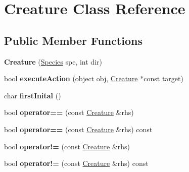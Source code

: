 \hypertarget{class_creature}{\section{Creature Class Reference}
\label{class_creature}
}
\subsection*{Public Member Functions}
\begin{DoxyCompactItemize}
\item 
\hypertarget{class_creature_afe661d9b6eeb76c8e0b7eb8d79b84298}{{\bfseries Creature} (\hyperlink{class_species}{Species} spe, int dir)}\label{class_creature_afe661d9b6eeb76c8e0b7eb8d79b84298}

\item 
\hypertarget{class_creature_a54cc3b4c16577e49e736e21e0943a277}{bool {\bfseries execute\-Action} (object obj, \hyperlink{class_creature}{Creature} $\ast$const target)}\label{class_creature_a54cc3b4c16577e49e736e21e0943a277}

\item 
\hypertarget{class_creature_a5846afe55a52389dbb7c7e54f1418338}{char {\bfseries first\-Inital} ()}\label{class_creature_a5846afe55a52389dbb7c7e54f1418338}

\item 
\hypertarget{class_creature_a27199cac2c81868601675b06209d450c}{bool {\bfseries operator==} (const \hyperlink{class_creature}{Creature} \&rhs)}\label{class_creature_a27199cac2c81868601675b06209d450c}

\item 
\hypertarget{class_creature_a4641e39d382f02afb77cfe6b57a9e2a2}{bool {\bfseries operator==} (const \hyperlink{class_creature}{Creature} \&rhs) const }\label{class_creature_a4641e39d382f02afb77cfe6b57a9e2a2}

\item 
\hypertarget{class_creature_aa3c43ac38a9e06b34f149c7508cc8298}{bool {\bfseries operator!=} (const \hyperlink{class_creature}{Creature} \&rhs)}\label{class_creature_aa3c43ac38a9e06b34f149c7508cc8298}

\item 
\hypertarget{class_creature_a8ebe67e36e2844ed93a9237358ef05d6}{bool {\bfseries operator!=} (const \hyperlink{class_creature}{Creature} \&rhs) const }\label{class_creature_a8ebe67e36e2844ed93a9237358ef05d6}

\end{DoxyCompactItemize}
